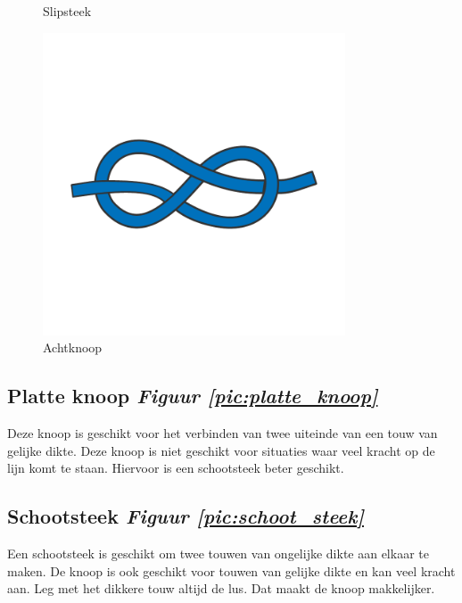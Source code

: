 \begin{figure}[h]
\begin{minipage}[b]{0.32\textwidth}
    \caption{Slipsteek}
    \label{pic:slip_steek}
    \end{minipage}
  \hfill
  \begin{minipage}[b]{0.32\textwidth}
    \centering
    \includegraphics[width=0.8\textwidth]{Hoofdstukken/Schiemannen/pdf/achtknoop.pdf}
    \caption{Achtknoop}
    \label{pic:achtknoop}
  \end{minipage}
\end{figure}
\subsection{Platte knoop \hfill \textit{Figuur \ref{pic:platte_knoop}}}
Deze knoop is geschikt voor het verbinden van twee uiteinde van een touw van gelijke dikte. Deze knoop is niet geschikt voor situaties waar veel kracht op de lijn komt te staan. Hiervoor is een schootsteek beter geschikt.
\subsection{Schootsteek \hfill \textit{Figuur \ref{pic:schoot_steek}}}
Een schootsteek is geschikt om twee touwen van ongelijke dikte aan elkaar te maken. De knoop is ook geschikt voor touwen van gelijke dikte en kan veel kracht aan. Leg met het dikkere touw altijd de lus. Dat maakt de knoop makkelijker. 
